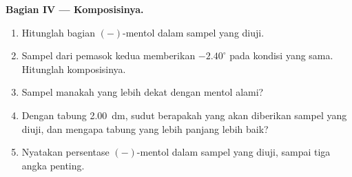 \begin{problem}
\medskip
\noindent\textbf{Bagian IV --- Komposisinya.}
\begin{enumerate}[resume]
  \item Hitunglah bagian $(-)$-mentol dalam sampel yang diuji.
  \item Sampel dari pemasok kedua memberikan $-2.40^\circ$ pada kondisi
        yang sama. Hitunglah komposisinya.
  \item Sampel manakah yang lebih dekat dengan mentol alami?
  \item Dengan tabung \qty{2.00}{dm}, sudut berapakah yang akan diberikan
        sampel yang diuji, dan mengapa tabung yang lebih panjang lebih
        baik?
  \item Nyatakan persentase $(-)$-mentol dalam sampel yang diuji, sampai
        tiga angka penting.
\end{enumerate}
\end{problem}
